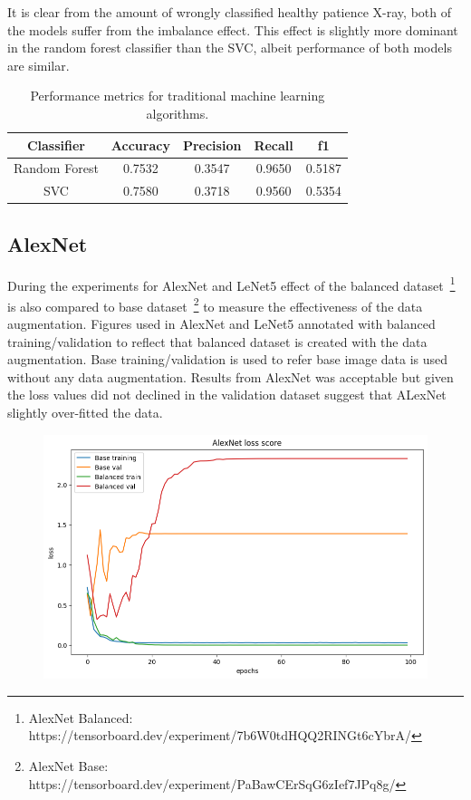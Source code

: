 It is clear from the amount of wrongly classified healthy patience X-ray, both of the models suffer from the imbalance effect.
This effect is slightly more dominant in the random forest classifier than the SVC, albeit performance of both models are similar.

\begin{table}[H]
    \centering
    \begin{tabular}{||c c c c c||} 
    \hline
    Classifier & Accuracy & Precision & Recall & f1\\ [0.5ex] 
    \hline\hline
    Random Forest & 0.7532 & 0.3547 & 0.9650 & 0.5187\\ 
    \hline
    SVC & 0.7580 & 0.3718 & 0.9560 & 0.5354\\
    \hline
    \end{tabular}
    \caption{Performance metrics for traditional machine learning algorithms.}
    \label{table:mlmetrics}
\end{table}



\subsection{AlexNet}
During the experiments for AlexNet and LeNet5 effect of the balanced dataset~\footnote{AlexNet Balanced: https://tensorboard.dev/experiment/7b6W0tdHQQ2RINGt6cYbrA/} is also compared to base dataset~\footnote{AlexNet Base: https://tensorboard.dev/experiment/PaBawCErSqG6zIef7JPq8g/} to measure the effectiveness of the data augmentation.
Figures used in AlexNet and LeNet5 annotated with balanced training/validation to reflect that balanced dataset is created with the data augmentation.
Base training/validation is used to refer base image data is used without any data augmentation.
Results from AlexNet was acceptable but given the loss values did not declined in the validation dataset suggest that ALexNet slightly over-fitted the data.

\begin{figure}[H]
    \centering
    \includegraphics[width=.9\textwidth]{img/alexnetloss.png}
    \caption{}
    \label{fig:alexloss}
\end{figure}

